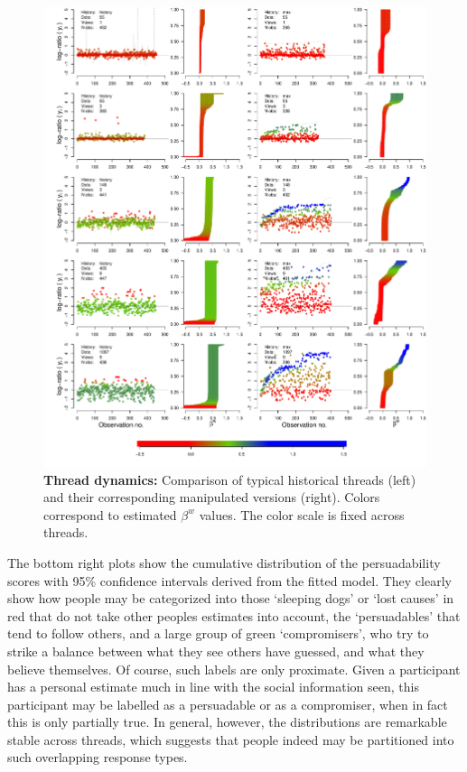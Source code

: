 \documentclass[9pt,a4paper,twocolumn,lineno]{article}
\begin{document}
\begin{figure}[!h]
	\centering
	\hspace{-30px}\includegraphics[width=1\linewidth]{thread_evolution}
	\caption{\footnotesize \textbf{Thread dynamics:} Comparison of typical historical threads (left) and their corresponding manipulated versions (right).
	Colors correspond to estimated $\beta^w$ values. The color scale is fixed across threads.}
\label{fig:more}
\end{figure}

The bottom right plots show the cumulative distribution of the persuadability scores with 95\% confidence intervals derived from the fitted model. They clearly show how people may be categorized into those ‘sleeping dogs’ or ‘lost causes’ \cite{devriendt2018literature} in red that do not take other peoples estimates into account, the `persuadables' that tend to follow others, and a large group of green `compromisers', who try to strike a balance between what they see others have guessed, and what they believe themselves. Of course, such labels are only proximate. Given a participant has a personal estimate much in line with the social information seen, this participant may be labelled as a persuadable or as a compromiser, when in fact this is only partially true. In general, however, the distributions are remarkable stable across threads, which suggests that people indeed may be partitioned into such overlapping response types.
\end{document}
